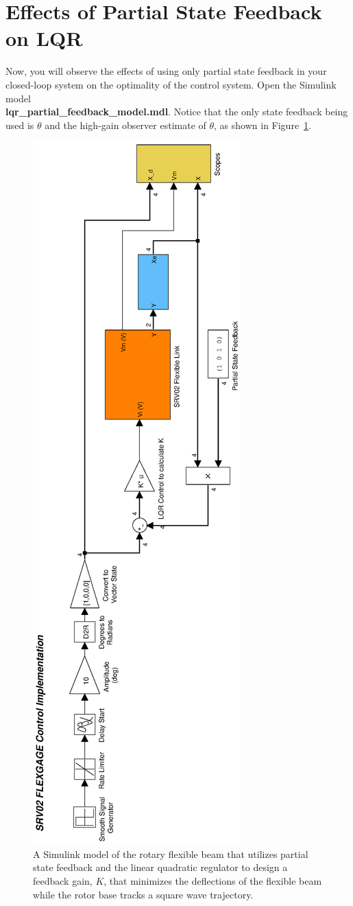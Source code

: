 \section{Effects of Partial State Feedback on LQR}\label{subsection:lab4_partial_feedback}
Now, you will observe the effects of using only partial state feedback in your closed-loop system on the optimality of the control system. Open the Simulink model\\ \textbf{lqr\_partial\_feedback\_model.mdl}. Notice that the only state feedback being used is $\theta$ and the high-gain observer estimate of $\dot{\theta}$, as shown in Figure~\ref{lab4_lqr_partial_simulink}.
\begin{figure}[htb!]
    \includegraphics[width=0.3\linewidth,angle=-90]{eps/lab_4/lqr_partial_feedback_simulink}
    \caption{A Simulink model of the rotary flexible beam that utilizes partial state feedback and the linear quadratic regulator to design a feedback gain, $K$, that minimizes the deflections of the flexible beam while the rotor base tracks a square wave trajectory.}
    \label{lab4_lqr_partial_simulink}
\end{figure}

